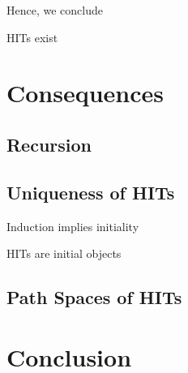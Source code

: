\documentclass[9pt]{entcs}
\newcommand{\1}{\type{1}} %
\begin{document}
Hence, we conclude

\begin{theorem}
HITs exist
\end{theorem}

\section{Consequences}

\subsection{Recursion}

\subsection{Uniqueness of HITs}

\begin{proposition}
Induction implies initiality
\end{proposition}

\begin{corollary}
HITs are initial objects
\end{corollary}

\subsection{Path Spaces of HITs}

\section{Conclusion}
\end{document}
